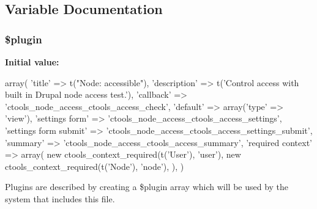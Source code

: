 \subsection{Variable Documentation}
\hypertarget{node__access_8inc_ada8a7130088351710bb02ed622d6bf65}{
\subsubsection[{\$plugin}]{\setlength{\rightskip}{0pt plus 5cm}\$plugin}}
\label{node__access_8inc_ada8a7130088351710bb02ed622d6bf65}
{\bfseries Initial value:}
\begin{DoxyCode}
 array(
  'title' => t("Node: accessible"),
  'description' => t('Control access with built in Drupal node access test.'),
  'callback' => 'ctools_node_access_ctools_access_check',
  'default' => array('type' => 'view'),
  'settings form' => 'ctools_node_access_ctools_access_settings',
  'settings form submit' => 'ctools_node_access_ctools_access_settings_submit',
  'summary' => 'ctools_node_access_ctools_access_summary',
  'required context' => array(
    new ctools_context_required(t('User'), 'user'),
    new ctools_context_required(t('Node'), 'node'),
  ),
)
\end{DoxyCode}
Plugins are described by creating a \$plugin array which will be used by the system that includes this file. 